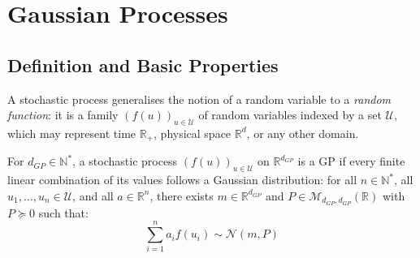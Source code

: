 \section{Gaussian Processes}
\label{sec:GP_definition}

\subsection{Definition and Basic Properties}

A stochastic process generalises the notion of a random variable to a
\emph{random function}: it is a family $(f(u))_{u \in \mathcal{U}}$ of random
variables indexed by a set $\mathcal{U}$, which may represent time
$\mathbb{R}_+$, physical space $\mathbb{R}^d$, or any other domain.

\begin{definition}
	For $d_{GP}\in\mathbb{N}^*$, a stochastic process $(f(u))_{u\in\mathcal{U}}$ on $\mathbb{R}^{d_{GP}}$ is a GP if every finite linear combination of its values follows a Gaussian distribution: for all $n\in\mathbb{N}^*$, all $u_1,\dots,u_n\in\mathcal{U}$, and all $a\in\mathbb{R}^n$, there exists $m\in\mathbb{R}^{d_{GP}}$ and $P\in\mathcal{M}_{d_{GP},d_{GP}}(\mathbb{R})$ with $P\succeq0$ such that:
	\begin{equation}
		\sum_{i=1}^na_if(u_i)\sim\mathcal{N}(m,P)
		\label{eq:GP_definition}
	\end{equation}
\end{definition}

